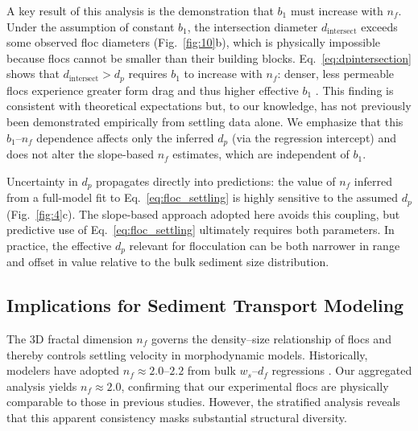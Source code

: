 \documentclass{agujournal2019}
\begin{document}
A key result of this analysis is the demonstration that $b_1$ must increase with $n_f$. Under the assumption of constant $b_1$, the intersection diameter $d_\text{intersect}$ exceeds some observed floc diameters (Fig.~\ref{fig:10}b), which is physically impossible because flocs cannot be smaller than their building blocks. Eq.~\eqref{eq:dpintersection} shows that $d_\text{intersect} > d_p$ requires $b_1$ to increase with $n_f$: denser, less permeable flocs experience greater form drag and thus higher effective $b_1$ \cite{strom2011explicit}. This finding is consistent with theoretical expectations but, to our knowledge, has not previously been demonstrated empirically from settling data alone. We emphasize that this $b_1$--$n_f$ dependence affects only the inferred $d_p$ (via the regression intercept) and does not alter the slope-based $n_f$ estimates, which are independent of $b_1$.

Uncertainty in $d_p$ propagates directly into predictions: the value of $n_f$ inferred from a full-model fit to Eq.~\eqref{eq:floc_settling} is highly sensitive to the assumed $d_p$ (Fig.~\ref{fig:4}c). The slope-based approach adopted here avoids this coupling, but predictive use of Eq.~\eqref{eq:floc_settling} ultimately requires both parameters. In practice, the effective $d_p$ relevant for flocculation can be both narrower in range and offset in value relative to the bulk sediment size distribution.

\subsection{Implications for Sediment Transport Modeling}

The 3D fractal dimension $n_f$ governs the density--size relationship of flocs and thereby controls settling velocity in morphodynamic models. Historically, modelers have adopted $n_f \approx 2.0$--$2.2$ from bulk $w_s$--$d_f$ regressions \cite{kranenburg1994fractal, son2008flocculation, winterwerp1998simple, winterwerp2004introduction, winterwerp2006heuristic}. Our aggregated analysis yields $n_f \approx 2.0$, confirming that our experimental flocs are physically comparable to those in previous studies. However, the stratified analysis reveals that this apparent consistency masks substantial structural diversity.
\end{document}
